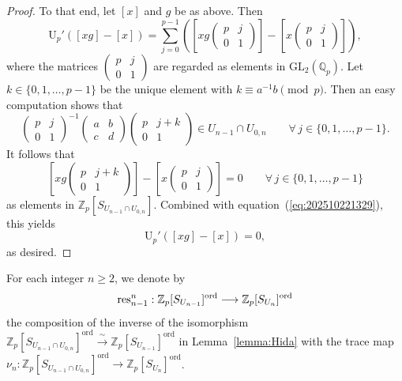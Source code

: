 \documentclass{amsart}
\numberwithin{equation}{section}
\newcommand{\bb}{\mathbb}
\newcommand{\ord}{\mathrm{ord}}
\newcommand{\GL}{\mathrm{GL}}
\newcommand{\res}{\textup{res}}
\begin{document}
\begin{proof}
    To that end, let $[x]$ and $g$ be as above. Then
    \begin{equation}\label{eq:202510221329}
    \mathrm{U}_p'([xg]-[x])=\sum_{j=0}^{p-1} \left(\left[xg\begin{pmatrix} p & j \\ 0 & 1 \end{pmatrix}\right]-\left[x\begin{pmatrix} p & j \\ 0 & 1 \end{pmatrix}\right]\right),
    \end{equation}
    where the matrices $\left(\begin{smallmatrix} p & j \\ 0 & 1 \end{smallmatrix}\right)$ are regarded as elements in $\GL_2(\bb{Q}_p)$. Let $k\in\lbrace 0,1,\ldots, p-1\rbrace$ be the unique element with $k\equiv a^{-1}b\pmod{p}$. Then an easy computation shows that
    \[
    \begin{pmatrix} p & j \\ 0 & 1 \end{pmatrix}^{-1} \begin{pmatrix} a & b \\ c & d \end{pmatrix}\begin{pmatrix} p & j+k \\ 0 & 1 \end{pmatrix}\in U_{n-1}\cap U_{0,n} \qquad \forall\, j\in \lbrace 0,1,\ldots,p-1\rbrace.
    \]
    It follows that
    \[
    \left[xg\begin{pmatrix} p & j+k \\ 0 & 1 \end{pmatrix}\right]-\left[x\begin{pmatrix} p & j \\ 0 & 1 \end{pmatrix}\right]=0\qquad \forall\,  j\in \lbrace 0,1,\ldots,p-1\rbrace
    \]
    as elements in $\mathbb{Z}_p[S_{U_{n-1}\cap U_{0,n}}]$. Combined with equation~(\ref{eq:202510221329}), this yields
    \[
    \mathrm{U}_p'([xg]-[x])=0,
    \]
    as desired.
\end{proof}

For each integer $n\geq 2$, we denote by
\[
\res_{n-1}^{n}:\bb{Z}_p[S_{U_{n-1}}]^\ord\longrightarrow \bb{Z}_p[S_{U_n}]^{\ord}
\]
the composition of the inverse of the isomorphism $\bb{Z}_p[S_{U_{n-1}\cap U_{0,n}}]^\ord\xrightarrow{\,\sim\,} \bb{Z}_p[S_{U_{n-1}}]^\ord$ in Lemma~\ref{lemma:Hida} with the trace map $\nu_n  : \bb{Z}_p[S_{U_{n-1}\cap U_{0,n}}]^\ord\rightarrow \bb{Z}_p[S_{U_{n}}]^\ord$.
\end{document}
